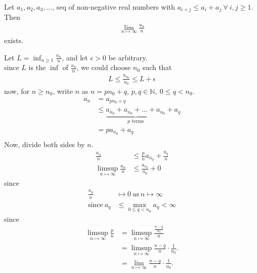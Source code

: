 \documentclass{article}
\begin{document}
\maketitle
\pagebreak

\begin{homeworkProblem}
    Let $a_1, a_2, a_3, \ldots$, seq of non-negative real numbers with 
    $a_{i+j} \leq a_i + a_j \ \forall \ i,j \geq 1$. Then
    \begin{align}
        \lim_{n \mapsto \infty} \frac{ a_n }{ n }
    \end{align}
    exists.\\
    \solution

    Let $L = \inf_{n \geq 1} \frac{ a_n }{ n }$,
    and let $\epsilon > 0$ be arbitrary.\\
    since $L$ is the $\inf$ of $\frac{ a_n }{ n }$, 
    we could choose $n_0$ such that 
    \begin{align}
        L \leq \frac{ a_{n_0} }{ n_0 } \leq L + \epsilon
    \end{align}
    now, for $n \geq n_0$, 
    write $n$ as $n=p n_0 + q$, $p,q \in \mathbb{N}, \ 0 \leq q < n_0$.
    \begin{align}
        a_n &= a_{p n_0 + q}\\ 
        &\leq \underbrace{a_{n_0} + a_{n_0} + \ldots + a_{n_0}}_{p \text{ terms}} + a_q\\
        &= p a_{n_0} + a_q\\
    \end{align}
    Now, divide both sides by $n$.
    \begin{align}
        \frac{ a_n }{ n } &\leq \frac{ p }{ n }a_{n_0} + \frac{ a_q }{ n }\\
        \limsup_{n \mapsto \infty} \frac{ a_n }{ n } &\leq \frac{ a_{n_0} }{ n_0 } + 0
    \end{align}
    since 
    \begin{align}
        \frac{ a_q }{ n } &\mapsto 0 \ \text{as} \ n \mapsto \infty\\
        \text{since} \ a_q &\leq \max_{0 \leq q < n_0} a_q < \infty
    \end{align}
    since 
    \begin{align}
        \limsup_{n \mapsto \infty} \frac{ p }{ n } 
        &= \limsup_{n \mapsto \infty} \frac{ \frac{ n-q }{ n_0 } }{ n }\\ 
        &= \limsup_{n \mapsto \infty} \frac{ n-q }{ n } \cdot \frac{ 1 }{ n_0 }.\\
        &= \lim_{n \mapsto \infty} \frac{ n-q }{ n } \cdot \frac{ 1 }{ n_0 }.\\

\end{align}
\end{homeworkProblem}
\end{document}
